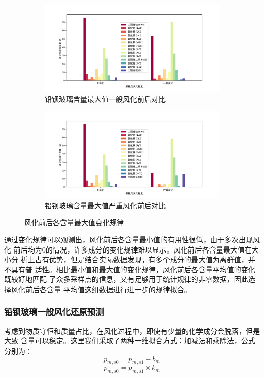 \documentclass[withoutpreface,bwprint]{cumcmthesis} %
\begin{document}
\begin{figure}[!htb]
    \centering
    \begin{subfigure}{0.4\textwidth}
        \centering
        \includegraphics[scale=0.25]{铅钡玻璃含量最大值一般风化前后对比.pdf}
        \caption{铅钡玻璃含量最大值一般风化前后对比}
    \end{subfigure}
    \begin{subfigure}{0.4\textwidth}
        \centering
        \includegraphics[scale=0.25]{铅钡玻璃含量最大值严重风化前后对比.pdf}
        \caption{铅钡玻璃含量最大值严重风化前后对比}
    \end{subfigure}
    \caption{风化前后各含量最大值变化规律}
    \label{fig:2}
\end{figure}

通过变化规律可以观测出，风化前后各含量最小值的有用性很低，由于多次出现风化
前后均为0的情况，许多成分的变化规律难以显示。风化前后各含量最大值在大小分
析上占有优势，但是结合实际数据发现，有多个成分的最大值为离群值，并不具有普
适性。相比最小值和最大值的变化规律，风化前后各含量平均值的变化既较好地匹配
了众多采样点的信息，又有足够用于统计规律的非零数据，因此选择风化前后各含量
平均值这组数据进行进一步的规律拟合。

\subsubsection{铅钡玻璃一般风化还原预测}
考虑到物质守恒和质量占比，在风化过程中，即使有少量的化学成分会脱落，但是大致
含量可以稳定。这里我们采取了两种一维拟合方式：加减法和乘除法，公式分别为：
\begin{equation}
    p_{m,s0}=p_{m,s1}-b_m \label{eq:0}
\end{equation}
\begin{equation}
    p_{m,s0}=p_{m,s1}\times k_m \label{eq:1}
\end{equation}
\end{document}
